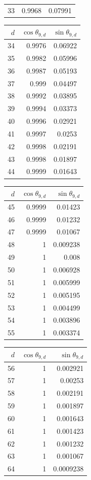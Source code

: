 {\begin{tabular}[t]{r|rr}
33 & 0.9968 & 0.07991
\end{tabular}\kern4pt
\begin{tabular}[t]{r|rr}
$d$ & $\cos\theta_{9,d}$ & $\sin\theta_{9,d}$ \\\hline
34 & 0.9976 & 0.06922 \\
35 & 0.9982 & 0.05996 \\
36 & 0.9987 & 0.05193 \\
37 & 0.999 & 0.04497 \\
38 & 0.9992 & 0.03895 \\
39 & 0.9994 & 0.03373 \\
40 & 0.9996 & 0.02921 \\
41 & 0.9997 & 0.0253 \\
42 & 0.9998 & 0.02191 \\
43 & 0.9998 & 0.01897 \\
44 & 0.9999 & 0.01643
\end{tabular}\kern4pt
\begin{tabular}[t]{r|rr}
$d$ & $\cos\theta_{9,d}$ & $\sin\theta_{9,d}$ \\\hline
45 & 0.9999 & 0.01423 \\
46 & 0.9999 & 0.01232 \\
47 & 0.9999 & 0.01067 \\
48 & 1 & 0.009238 \\
49 & 1 & 0.008 \\
50 & 1 & 0.006928 \\
51 & 1 & 0.005999 \\
52 & 1 & 0.005195 \\
53 & 1 & 0.004499 \\
54 & 1 & 0.003896 \\
55 & 1 & 0.003374
\end{tabular}\kern4pt
\begin{tabular}[t]{r|rr}
$d$ & $\cos\theta_{9,d}$ & $\sin\theta_{9,d}$ \\\hline
56 & 1 & 0.002921 \\
57 & 1 & 0.00253 \\
58 & 1 & 0.002191 \\
59 & 1 & 0.001897 \\
60 & 1 & 0.001643 \\
61 & 1 & 0.001423 \\
62 & 1 & 0.001232 \\
63 & 1 & 0.001067 \\
64 & 1 & 0.0009238
\end{tabular}}

